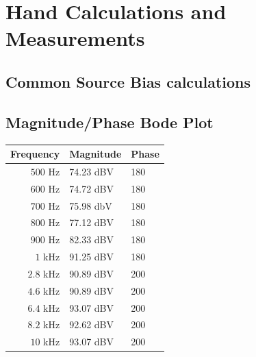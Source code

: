 \documentclass[11pt, twoside, letterpaper]{article}
\begin{document}
\section{Hand Calculations and Measurements}
\subsection{Common Source Bias calculations}


\subsection*{Magnitude/Phase Bode Plot}

\begin{tabular}{|r|l|l|}
\hline
Frequency & Magnitude & Phase\\
\hline
$500$ Hz & 74.23 dBV & 180 \\
$600$ Hz & 74.72 dBV & 180 \\
$700$ Hz & 75.98 dbV & 180 \\
$800$ Hz & 77.12 dBV & 180 \\
$900$ Hz & 82.33 dBV & 180 \\
$1$ kHz & 91.25 dBV & 180 \\
$2.8$ kHz & 90.89 dBV & 200 \\
$4.6$ kHz & 90.89 dBV & 200 \\
$6.4$ kHz& 93.07 dBV & 200 \\
$8.2$ kHz & 92.62 dBV & 200 \\
$10$  kHz& 93.07 dBV & 200 \\
\hline
\end{tabular}
\end{document}
